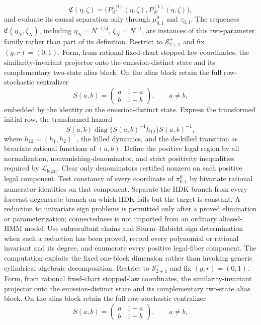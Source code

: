 \[
 \mathfrak C(\eta,\zeta)=
 \bigl(P_W^{(0)}(\eta,\zeta),P_W^{(1)}(\eta,\zeta)\bigr),
\]
and evaluate its causal separation only through \(\mu^0_{0,1}\) and \(\tau_{0,1}\). The sequences \(\mathfrak C(\eta_N,\zeta_N)\), including \(\eta_N=N^{-1/4}\), \(\zeta_N=N^{-1}\), are instances of this two-parameter family rather than part of its definition.
Restrict to \(\mathcal S^{+}_{2+1}\) and fix \((g,r)=(0,1)\). Form, from rational fixed-chart stopped-law coordinates, the similarity-invariant projector onto the emission-distinct state and its complementary two-state alias block. On the alias block retain the full row-stochastic centralizer
\[
 S(a,b)=\begin{pmatrix}a&1-a\\ b&1-b\end{pmatrix},\qquad a\ne b,
\]
embedded by the identity on the emission-distinct state. Express the transformed initial row, the transformed hazard
\[
 S(a,b)\operatorname{diag}\{S(a,b)^{-1}h_{12}\}S(a,b)^{-1},
\]
where \(h_{12}=(h_1,h_2)^{\top}\), the killed dynamics, and the de-killed transition as bivariate rational functions of \((a,b)\). Define the positive legal region by all normalization, nonvanishing-denominator, and strict positivity inequalities required by \(\mathcal L_{\mathrm{legal}}\). Clear only denominators certified nonzero on each positive legal component. Test constancy of every coordinate of \(\pi^0_{0,1}\) by bivariate rational numerator identities on that component. Separate the HDK branch from every forecast-degenerate branch on which HDK fails but the target is constant. A reduction to univariate sign problems is permitted only after a proved elimination or parameterization; connectedness is not imported from an ordinary aliased-HMM model. Use subresultant chains and Sturm--Habicht sign determination when such a reduction has been proved, record every polynomial or rational invariant and its degree, and enumerate every positive legal-fiber component. The computation exploits the fixed one-block dimension rather than invoking generic cylindrical algebraic decomposition.
Restrict to \(\mathcal S^{+}_{2+1}\) and fix \((g,r)=(0,1)\). Form, from rational fixed-chart stopped-law coordinates, the similarity-invariant projector onto the emission-distinct state and its complementary two-state alias block. On the alias block retain the full row-stochastic centralizer
\[
 S(a,b)=\begin{pmatrix}a&1-a\\ b&1-b\end{pmatrix},\qquad a\ne b,
\]
